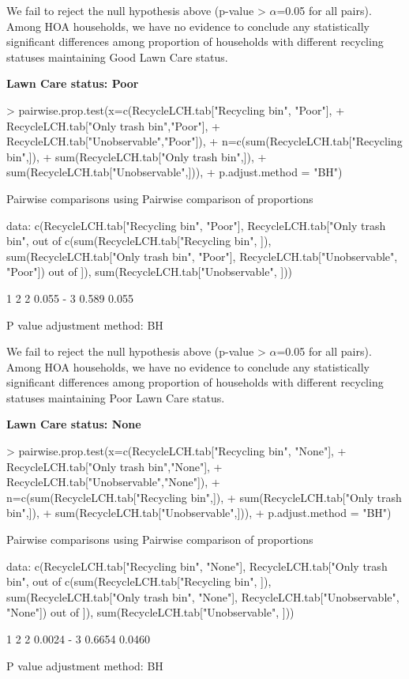 \documentclass{article}
\begin{document}
We fail to reject the null hypothesis above (p-value > $\alpha$=0.05 for all pairs). Among HOA households, we have no evidence to conclude any statistically significant differences among proportion of households with different recycling statuses maintaining Good Lawn Care status.

\textbf{Lawn Care status: Poor}

\begin{Schunk}
\begin{Sinput}
> pairwise.prop.test(x=c(RecycleLCH.tab["Recycling bin", "Poor"],
+   RecycleLCH.tab["Only trash bin","Poor"], 
+       RecycleLCH.tab["Unobservable","Poor"]), 
+       n=c(sum(RecycleLCH.tab["Recycling bin",]), 
+       sum(RecycleLCH.tab["Only trash bin",]), 
+       sum(RecycleLCH.tab["Unobservable",])),
+       p.adjust.method = "BH")
\end{Sinput}
\begin{Soutput}
	Pairwise comparisons using Pairwise comparison of proportions 

data:  c(RecycleLCH.tab["Recycling bin", "Poor"], RecycleLCH.tab["Only trash bin",  out of c(sum(RecycleLCH.tab["Recycling bin", ]), sum(RecycleLCH.tab["Only trash bin",      "Poor"], RecycleLCH.tab["Unobservable", "Poor"]) out of     ]), sum(RecycleLCH.tab["Unobservable", ])) 

  1     2    
2 0.055 -    
3 0.589 0.055

P value adjustment method: BH 
\end{Soutput}
\end{Schunk}

We fail to reject the null hypothesis above (p-value > $\alpha$=0.05 for all pairs). Among HOA households, we have no evidence to conclude any statistically significant differences among proportion of households with different recycling statuses maintaining Poor Lawn Care status.

\textbf{Lawn Care status: None}

\begin{Schunk}
\begin{Sinput}
> pairwise.prop.test(x=c(RecycleLCH.tab["Recycling bin", "None"],
+   RecycleLCH.tab["Only trash bin","None"], 
+       RecycleLCH.tab["Unobservable","None"]), 
+       n=c(sum(RecycleLCH.tab["Recycling bin",]), 
+       sum(RecycleLCH.tab["Only trash bin",]), 
+       sum(RecycleLCH.tab["Unobservable",])),
+       p.adjust.method = "BH")
\end{Sinput}
\begin{Soutput}
	Pairwise comparisons using Pairwise comparison of proportions 

data:  c(RecycleLCH.tab["Recycling bin", "None"], RecycleLCH.tab["Only trash bin",  out of c(sum(RecycleLCH.tab["Recycling bin", ]), sum(RecycleLCH.tab["Only trash bin",      "None"], RecycleLCH.tab["Unobservable", "None"]) out of     ]), sum(RecycleLCH.tab["Unobservable", ])) 

  1      2     
2 0.0024 -     
3 0.6654 0.0460

P value adjustment method: BH 
\end{Soutput}
\end{Schunk}
\end{document}
